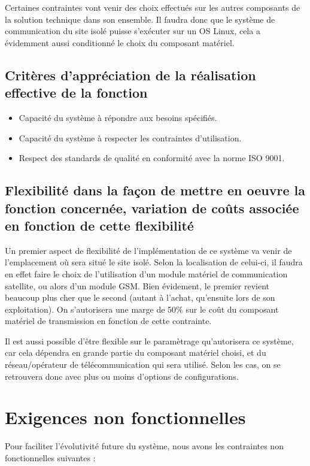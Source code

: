 Certaines contraintes vont venir des choix effectués sur les autres composants de la solution technique dans son ensemble. Il faudra donc que le système de communication du site isolé puisse s'exécuter sur un OS Linux, cela a évidemment aussi conditionné le choix du composant matériel.

\subsection{Critères d'appréciation de la réalisation effective de la fonction}

\begin{itemize}
\item Capacité du système à répondre aux besoins spécifiés.
\item Capacité du système à respecter les contraintes d'utilisation.
\item Respect des standards de qualité en conformité avec la norme ISO 9001.
\end{itemize}

\subsection{Flexibilité dans la façon de mettre en oeuvre la fonction concernée, variation de coûts associée en fonction de cette flexibilité}

Un premier aspect de flexibilité de l'implémentation de ce système va venir de l'emplacement où sera situé le site isolé. Selon la localisation de celui-ci, il faudra en effet faire le choix de l'utilisation d'un module matériel de communication satellite, ou alors d'un module GSM. Bien évidement, le premier revient beaucoup plus cher que le second (autant à l'achat, qu'ensuite lors de son exploitation). On s'autorisera une marge de 50\% sur le coût du composant matériel de transmission en fonction de cette contrainte.

Il est aussi possible d'être flexible sur le paramètrage qu'autorisera ce système, car cela dépendra en grande partie du composant matériel choisi, et du réseau/opérateur de télécommunication qui sera utilisé. Selon les cas, on se retrouvera donc avec plus ou moins d'options de configurations.

\section{Exigences non fonctionnelles}

Pour faciliter l'évolutivité future du système, nous avons les contraintes non fonctionnelles suivantes :

